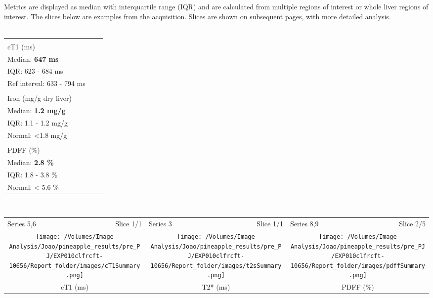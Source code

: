 \documentclass{article}
\begin{document}
\noindent Metrics are displayed as median with interquartile range (IQR) and are calculated from multiple regions of interest or  whole liver regions of interest. The slices below are examples from the acquisition. Slices are shown on subsequent  pages, with more detailed analysis. \\ \\ 
\color{white}\begin{center}
\begin{tabular*}{0.975\textwidth}{@{\extracolsep{\fill}}p{} p{} p{}@{}}
\rowcolor{PDblue}
\centering \textbf{\\cT1 (ms)}  \\ Median: \textbf{647 ms} \\ IQR: 623 - 684 ms \\ Ref interval\cite{standardisedcT1NormalRange}: 633 - 794 ms \\ 
&
\centering \textbf{\\Iron (mg/g dry liver)}  \\ Median: \textbf{1.2 mg/g} \\ IQR: 1.1 - 1.2 mg/g \\ Normal\cite{ironNormalRange}: <1.8 mg/g \\ 
&
\centering \textbf{\\PDFF (\%)}  \\ Median: \textbf{2.8 \%} \\ IQR: 1.8 - 3.8 \% \\ Normal:\cite{fatNormalRange} < 5.6 \% \\ 
\end{tabular*} \\
\color{black}
\vspace*{2cm}
\begin{tabular}{c c c c c c }
\multicolumn{1}{l}{Series 5,6} & 
\multicolumn{1}{r}{Slice 1/1} 
& 
\multicolumn{1}{l}{Series 3} & 
\multicolumn{1}{r}{Slice 1/1} 
& 
\multicolumn{1}{l}{Series 8,9} & 
\multicolumn{1}{r}{Slice 2/5} 
\\ 
\multicolumn{2}{c}{\texttt{[image: /Volumes/Image Analysis/Joao/pineapple\_results/pre\_PJ/EXP010clfrcft-10656/Report\_folder/images/cT1Summary.png]}}
& 
\multicolumn{2}{c}{\texttt{[image: /Volumes/Image Analysis/Joao/pineapple\_results/pre\_PJ/EXP010clfrcft-10656/Report\_folder/images/t2sSummary.png]}}
& 
\multicolumn{2}{c}{\texttt{[image: /Volumes/Image Analysis/Joao/pineapple\_results/pre\_PJ/EXP010clfrcft-10656/Report\_folder/images/pdffSummary.png]}}
\\ 
\multicolumn{2}{c}{cT1 (ms)}
& 
\multicolumn{2}{c}{T2* (ms)}
& 
\multicolumn{2}{c}{PDFF (\%)}
\\ 
\end{tabular}
\end{center}
\end{document}
